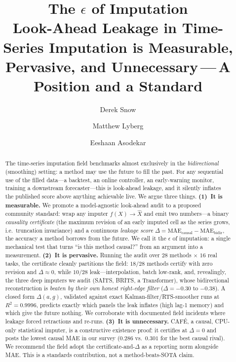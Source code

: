 \documentclass[10pt,twocolumn]{article}
\title{\textbf{The $\epsilon$ of Imputation}\\[3pt]
  {\large\normalfont Look-Ahead Leakage in Time-Series Imputation is Measurable,
   Pervasive, and Unnecessary\,---\,A Position and a Standard}}
\author[1]{Derek Snow}
\author[1]{Matthew Lyberg}
\author[1]{Eeshaan Asodekar}
\affil[1]{Sovai Research \quad \texttt{d.snow@sov.ai}}
\date{}
\newcommand{\cafe}{CAF\'E}
\begin{document}
\maketitle

\begin{abstract}
\noindent
The time-series imputation field benchmarks almost exclusively in the
\emph{bidirectional} (smoothing) setting: a method may use the future to fill the
past. For any sequential use of the filled data---a backtest, an online
controller, an early-warning monitor, training a downstream forecaster---this is
look-ahead leakage, and it silently inflates the published score above anything
achievable live. We argue three things. \textbf{(1)~It is measurable.} We promote
a model-agnostic look-ahead audit to a proposed community standard: wrap any
imputer $f(X)\!\to\!\hat X$ and emit two numbers---a binary \emph{causality
certificate} (the maximum revision of an early imputed cell as the series grows,
i.e.\ truncation invariance) and a continuous \emph{leakage score}
$\Delta=\mathrm{MAE}_{\text{causal}}-\mathrm{MAE}_{\text{bidir}}$, the accuracy a
method borrows from the future. We call it the $\epsilon$ of imputation: a single
mechanical test that turns ``is this method causal?'' from an argument into a
measurement. \textbf{(2)~It is pervasive.} Running the audit over $28$ methods
$\times$ $16$ real tasks, the certificate cleanly partitions the field: $18/28$
methods certify with zero revision and $\Delta\!\approx\!0$, while $10/28$
leak---interpolation, batch low-rank, and, revealingly, the three deep imputers
we audit (SAITS, BRITS, a Transformer), whose bidirectional reconstruction is
\emph{beaten by their own honest right-edge filter} ($\Delta=-0.30$ to $-0.38$).
A closed form $\Delta(a,g)$, validated against exact Kalman-filter/RTS-smoother
runs at $R^2=0.9996$, predicts exactly which panels the leak inflates (high
lag-1 memory) and which give the future nothing. We corroborate with documented
field incidents where leakage forced retractions and re-runs.
\textbf{(3)~It is unnecessary.} \cafe{}, a causal, CPU-only statistical imputer,
is a constructive existence proof: it certifies at $\Delta=0$ and posts the
lowest causal MAE in our survey ($0.286$ vs.\ $0.301$ for the best causal
rival). We recommend the field adopt the certificate-and-$\Delta$ as a reporting
norm alongside MAE. This is a standards contribution, not a method-beats-SOTA
claim.
\end{abstract}
\end{document}
